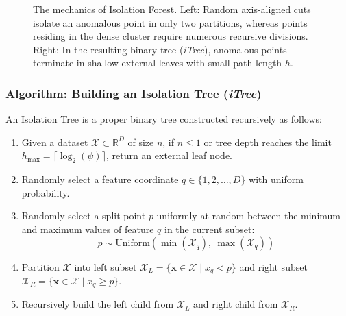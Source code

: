 \begin{figure}[htbp]
\caption{The mechanics of Isolation Forest. Left: Random axis-aligned cuts isolate an anomalous point in only two partitions, whereas points residing in the dense cluster require numerous recursive divisions. Right: In the resulting binary tree (\textit{iTree}), anomalous points terminate in shallow external leaves with small path length $h$.}\label{fig:isolation_forest_concept}
\end{figure}

\subsubsection{Algorithm: Building an Isolation Tree (\textit{iTree})}

An Isolation Tree is a proper binary tree constructed recursively as follows:
\begin{enumerate}
    \item Given a dataset $\mathcal{X} \subset \mathbb{R}^D$ of size $n$, if $n \le 1$ or tree depth reaches the limit $h_{\max} = \lceil \log_2(\psi) \rceil$, return an external leaf node.
    \item Randomly select a feature coordinate $q \in \{1, 2, \dots, D\}$ with uniform probability.
    \item Randomly select a split point $p$ uniformly at random between the minimum and maximum values of feature $q$ in the current subset:
    \begin{equation}
    p \sim \text{Uniform}(\min(\mathcal{X}_q), \ \max(\mathcal{X}_q))\label{eq:random_split}
    \end{equation}
    \item Partition $\mathcal{X}$ into left subset $\mathcal{X}_L = \{\mathbf{x} \in \mathcal{X} \mid x_q < p\}$ and right subset $\mathcal{X}_R = \{\mathbf{x} \in \mathcal{X} \mid x_q \ge p\}$.
    \item Recursively build the left child from $\mathcal{X}_L$ and right child from $\mathcal{X}_R$.
\end{enumerate}


